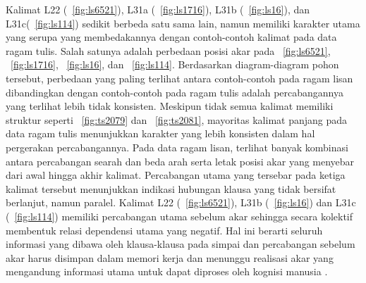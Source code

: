 Kalimat L22 (\pic~\ref{fig:ls6521}), L31a (\pic~\ref{fig:ls1716}), L31b (\pic~\ref{fig:ls16}), dan L31c(\pic~\ref{fig:ls114}) sedikit berbeda satu sama lain, namun memiliki karakter utama yang serupa yang membedakannya dengan contoh-contoh kalimat pada data ragam tulis. Salah satunya adalah perbedaan posisi akar pada \pic~\ref{fig:ls6521}, \pic~\ref{fig:ls1716}, \pic~\ref{fig:ls16}, dan \pic~\ref{fig:ls114}. Berdasarkan diagram-diagram pohon tersebut, perbedaan yang paling terlihat antara contoh-contoh pada ragam lisan dibandingkan dengan contoh-contoh pada ragam tulis adalah percabangannya yang terlihat lebih tidak konsisten. Meskipun tidak semua kalimat memiliki struktur seperti \pic~\ref{fig:ts2079} dan \pic~\ref{fig:ts2081}, mayoritas kalimat panjang pada data ragam tulis menunjukkan karakter yang lebih konsisten dalam hal pergerakan percabangannya. Pada data ragam lisan, terlihat banyak kombinasi antara percabangan searah dan beda arah serta letak posisi akar yang menyebar dari awal hingga akhir kalimat. Percabangan utama yang tersebar pada ketiga kalimat tersebut menunjukkan indikasi hubungan klausa yang tidak bersifat berlanjut, namun paralel. Kalimat L22 (\pic~\ref{fig:ls6521}), L31b (\pic~\ref{fig:ls16}) dan L31c (\pic~\ref{fig:ls114}) memiliki percabangan utama sebelum akar sehingga secara kolektif membentuk relasi dependensi utama yang negatif. Hal ini berarti seluruh informasi yang dibawa oleh klausa-klausa pada simpai dan percabangan sebelum akar harus disimpan dalam memori kerja dan menunggu realisasi akar yang mengandung informasi utama untuk dapat diproses oleh kognisi manusia \citep{hawkins2014cross}.


